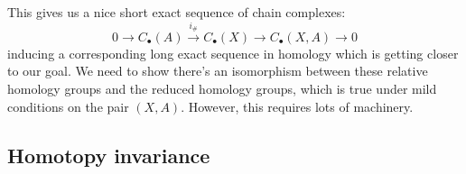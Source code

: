 \documentclass[a4paper]{article}
\begin{document}
\begin{exercise}
\end{exercise}
This gives us a nice short exact sequence of chain complexes: \[
    0\rightarrow C_\bullet(A)\xrightarrow{i_\#} C_\bullet(X) \rightarrow C_\bullet(X,A)\rightarrow 0
\]
inducing a corresponding long exact sequence in homology which is getting closer to our goal. We need to show there's an isomorphism between these relative homology groups and the reduced homology groups, which is true under mild conditions on the pair $(X,A)$. However, this requires lots of machinery.

\subsection{Homotopy invariance}
\end{document}
